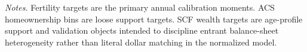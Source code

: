 \begin{table}[H]
\begin{tabularx}{0.98\linewidth}{@{}>{\raggedright\arraybackslash}p{1.25cm}>{\raggedright\arraybackslash}p{3.10cm}>{\raggedright\arraybackslash}p{1.80cm}ccc>{\raggedright\arraybackslash}X@{}}
\end{tabularx}
\begin{minipage}{0.94\textwidth}\vspace{4pt}\scriptsize
\textit{Notes.} Fertility targets are the primary annual calibration moments. ACS homeownership bins are loose support targets. SCF wealth targets are age-profile support and validation objects intended to discipline entrant balance-sheet heterogeneity rather than literal dollar matching in the normalized model.
\end{minipage}
\end{table}
